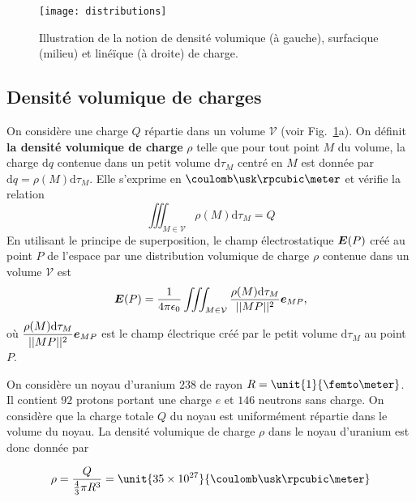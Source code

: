 \begin{figure}
	\centering
	\texttt{[image: distributions]}
	\caption{Illustration de la notion de densité volumique (à gauche),
		 surfacique (milieu) et linéïque (à droite) de charge.}%
	\label{fig:distributions}
\end{figure}

\subsection{Densité volumique de charges}
	On considère une charge $Q$ répartie dans un volume $\mathcal{V}$
	(voir Fig.~\ref{fig:distributions}a). 
	On définit \textbf{
	la densité volumique de charge} $\rho$ 
	telle que pour tout point $M$ du volume,
	la charge $\mathrm{d}q$ contenue dans un petit volume $\mathrm{d}\tau_M$ centré 
	en $M$ est donnée par $\mathrm{d}q = \rho(M) \mathrm{d}\tau_M$.
	Elle s'exprime en $\coulomb \usk \rpcubic \meter$ et vérifie la relation
\begin{equation*}
	\iiint_{M \in \mathcal{V}} \rho(M) \mathrm{d}\tau_M = Q
\end{equation*}
En utilisant le principe de superposition, le champ électrostatique $\vece(P)$
créé au point $P$ de l'espace par une distribution volumique de charge $\rho$
contenue dans un volume $\mathcal{V}$ est
\begin{equation}
	\vece(P) = \pieps \iiint_{M \in \mathcal{V}} 
	\dfrac{\rho(M) \mathrm{d}\tau_M}{||MP||^2}\mitbf{e}_{MP},
\end{equation}
où $\dfrac{\rho(M) \mathrm{d}\tau_M}{||MP||^2}\mitbf{e}_{MP}$ est le champ 
électrique créé par le petit volume $\mathrm{d}\tau_M$ au point $P$.

\begin{exemple}
	On considère un noyau d'uranium $238$ de rayon $R = \unit{1}{\femto \meter}$.
	Il contient $92$ protons portant une charge $e$ et $146$ neutrons sans charge.
	On considère que la charge totale $Q$ du noyau est uniformément répartie
	dans le volume du noyau. La densité volumique de charge $\rho$ dans 
	le noyau d'uranium est donc donnée par

	\begin{equation*}
		\rho = \dfrac{Q}{\frac{4}{3}\pi R^3} = 
		\unit{35 \times 10^{27}}{\coulomb \usk \rpcubic \meter}
	\end{equation*}
\end{exemple}

